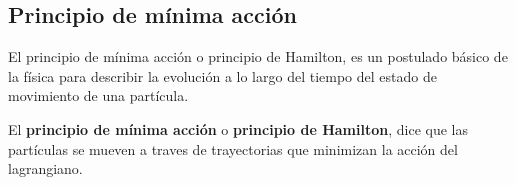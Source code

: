 \subsection{Principio de mínima acción}

El principio de mínima acción o principio de Hamilton, es un postulado básico de la física para describir la evolución a lo largo del tiempo del estado de movimiento de una partícula.

El \textbf{principio de mínima acción} o \textbf{principio de Hamilton}, dice que las partículas se mueven a traves de trayectorias que minimizan la acción del lagrangiano.
